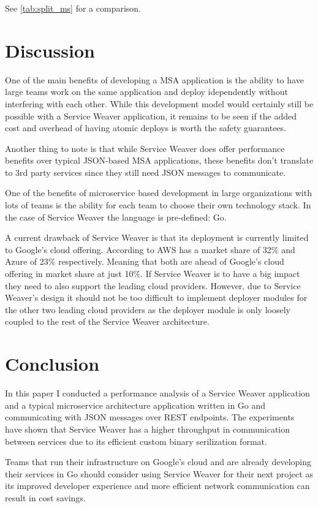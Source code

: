 \documentclass[sigconf,review,9pt]{acmart}
\begin{document}
See \ref{tab:split_ms} for a comparison.

\section{Discussion}

One of the main benefits of developing a MSA application is the ability to
have large teams work on the same application and deploy idependently without
interfering with each other. \cite{what}
While this development model would certainly still be possible with a Service Weaver
application, it remains to be seen if the added cost and overhead of having atomic
deploys is worth the safety guarantees.

Another thing to note is that while Service Weaver does offer performance benefits
over typical JSON-based MSA applications, these benefits don't translate to 3rd party
services since they still need JSON messages to communicate.

One of the benefits of microservice based development in large organizations with
lots of teams is the ability for each team to choose their own technology stack.
In the case of Service Weaver the language is pre-defined: Go.

A current drawback of Service Weaver is that its deployment is currently limited to Google's
cloud offering.
According to \cite{InfographicBigThree2023} AWS \cite{AmazonWebServices} has a
market share of 32\% and Azure \cite{Azure} of 23\% respectively.
Meaning that both are ahead of Google's cloud offering \cite{GoogleCloud} in market
share at just 10\%.
If Service Weaver is to have a big impact they need to also support the leading
cloud providers.
However, due to Service Weaver's design it should not be too difficult to implement deployer
modules for the other two leading cloud providers as the deployer module is only
loosely coupled to the rest of the Service Weaver architecture. \cite{HowImplementService}

\section{Conclusion}
In this paper I conducted a performance analysis of a Service Weaver application
and a typical microservice architecture application written in Go and communicating
with JSON messages over REST endpoints.
The experiments have shown that Service Weaver has a higher throughput in communication
between services due to its efficient custom binary serilization format.

Teams that run their infrastructure on Google's cloud and are already developing
their services in Go should consider using Service Weaver for their next project
as its improved developer experience and more efficient network communication can
result in cost savings.



\end{document}
